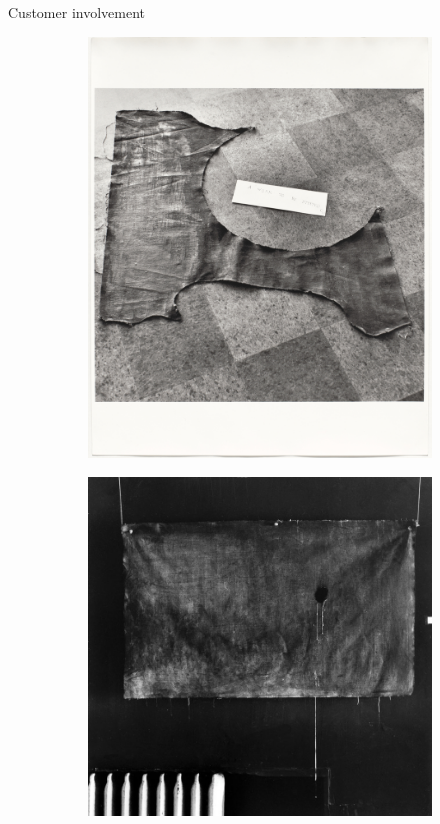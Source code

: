\documentclass{beamer}
\begin{document}
\begin{frame}
{\centerline{Customer involvement}}

\begin{figure}
\centering
\begin{subfigure}{.5\textwidth}
  \centering
  \includegraphics[width=.9\linewidth]{P2023.AIBCCSS.Drawing/yoko.jpg}
\end{subfigure}%
\begin{subfigure}{.5\textwidth}
  \centering
  \includegraphics[width=.8\linewidth]{P2023.AIBCCSS.Drawing/smoke.jpeg}
\end{subfigure}
\end{figure}

\end{frame}
\end{document}
